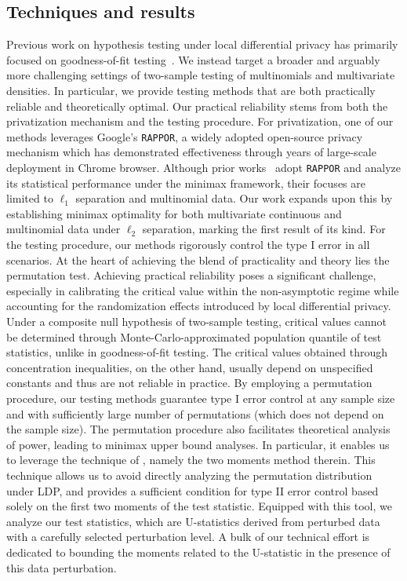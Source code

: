 \documentclass[twoside,11pt]{article}
\begin{document}
\subsection{Techniques and results}\label{subsection:techniques}
Previous work on hypothesis testing under local differential privacy has primarily focused on goodness-of-fit testing~\citep{Dubois2022, Lam-Weil2021MinimaxConstraint}. We instead target a broader and arguably more challenging settings of two-sample testing of multinomials and multivariate densities.  In particular, we provide testing methods that are both practically reliable and theoretically optimal.
Our practical reliability stems from both the privatization mechanism and the testing procedure. For privatization, one of our methods leverages Google's \texttt{RAPPOR}, a widely adopted open-source privacy mechanism  which has demonstrated effectiveness through years of large-scale deployment in Chrome browser. 
Although prior works~\citep{duchi2013local, acharya_test_2019, acharya_estimating_2021} adopt \texttt{RAPPOR} and analyze its statistical performance under the minimax framework, their focuses are limited to $\ell_1$ separation and multinomial data. Our work expands upon this by establishing minimax optimality for both multivariate continuous and multinomial data under  $\ell_2$ separation, marking the first result of its kind.
For the testing procedure, our methods rigorously control the type I error in all scenarios. At the heart of achieving the blend of practicality and theory lies the permutation test.
Achieving practical reliability poses a significant challenge, especially in calibrating the critical value within the non-asymptotic regime while accounting for the randomization effects introduced by local differential privacy.
Under a composite null hypothesis of two-sample testing, critical values cannot be determined through Monte-Carlo-approximated population quantile of test statistics,
unlike in goodness-of-fit testing.
The critical values obtained through concentration inequalities, on the other hand, usually depend on unspecified constants and thus are not reliable in practice.
By employing a permutation procedure, our testing methods guarantee type I error control at any sample size and with sufficiently large number of permutations (which does not depend on the sample size). The permutation procedure also facilitates theoretical analysis of power, leading to minimax upper bound analyses. In particular, it enables us to leverage the technique of \citet{kim_minimax_2022}, namely the two moments method therein.
This technique allows us to avoid directly analyzing the permutation distribution under LDP, and provides a sufficient condition for type II error control based solely on the first two moments of the test statistic. Equipped with this tool, we analyze our test statistics, which are U-statistics derived from perturbed data with a carefully selected perturbation level. A bulk of our technical effort is dedicated to bounding the moments related to the U-statistic in the presence of this data perturbation.
\end{document}
